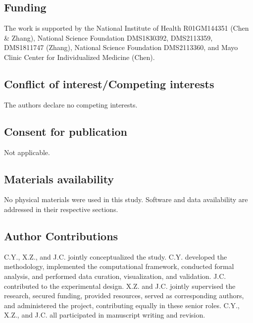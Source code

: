 \documentclass[pdflatex,sn-nature]{sn-jnl}%
\theoremstyle{thmstyleone}%
\theoremstyle{thmstyletwo}%
\theoremstyle{thmstylethree}%
\begin{document}
\subsection{Funding}
The work is supported by the National Institute of Health R01GM144351 (Chen \& Zhang), National Science Foundation DMS1830392, DMS2113359, DMS1811747 (Zhang), National Science Foundation DMS2113360, and Mayo Clinic Center for Individualized Medicine (Chen).

\subsection{Conflict of interest/Competing interests}
The authors declare no competing interests.

\subsection{Consent for publication}
Not applicable.

\subsection{Materials availability}
No physical materials were used in this study. Software and data availability are addressed in their respective sections.

\subsection{Author Contributions}
C.Y., X.Z., and J.C. jointly conceptualized the study. C.Y. developed the methodology, implemented the computational framework, conducted formal analysis, and performed data curation, visualization, and validation. J.C. contributed to the experimental design. X.Z. and J.C. jointly supervised the research, secured funding, provided resources, served as corresponding authors, and administered the project, contributing equally in these senior roles. C.Y., X.Z., and J.C. all participated in manuscript writing and revision.
\end{document}
